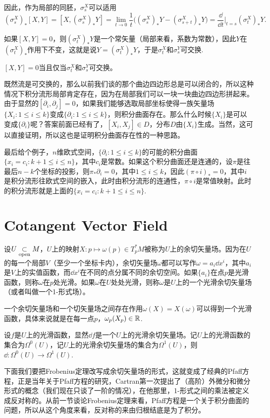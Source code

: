 因此，作为局部的同胚，$\sigma_s^X$可以适用
\[
	(\sigma_s^X)_*[X,Y]=[X,(\sigma_s^X)_*Y]=\lim_{t\to 0}\frac{1}{t}\bigl((\sigma_s^X)_*Y-(\sigma_{s+t}^X)_*Y\bigr)=\frac{\dd}{\dd t}\biggr|_{t=s}(\sigma_t^X)_*Y.
\]

如果$[X,Y]=0$，则$(\sigma_t^X)_*Y$是一个常矢量（局部来看，系数为常数），因此$Y$在$(\sigma_t^X)_*$作用下不变，这就是说$Y=(\sigma_t^X)_*Y$，于是$\sigma_t^X$和$\sigma_s^Y$可交换.

\para $[X,Y]=0$当且仅当$\sigma_t^X$和$\sigma_s^Y$可交换。

既然流是可交换的，那么以前我们谈的那个曲边四边形总是可以闭合的，所以这种情况下积分流形局部肯定存在，因为在局部我们可以一块一块曲边四边形拼起来。由于显然的$[\partial_i,\partial_j]=0$，如果我们能够选取局部坐标使得一族矢量场$\{X_i:1\leq i \leq k\}$变成$\{\partial_i:1\leq i \leq k\}$，则积分曲面存在。那么什么时候$\{X_i\}$是可以变成$\{\partial_i\}$呢？答案前面已经有了，$[X_i,X_j]\in D$，分布$D$由$\{X_i\}$生成。当然，这可以直接证明，所以这也是证明积分曲面存在性的一种思路。

最后给个例子，$n$维欧式空间，$\{\partial_i:1\leq i \leq k\}$的可能的积分曲面$\{x_i=c_i:k+1\leq i \leq n\}$，其中$c_i$是常数。如果这个积分曲面还是连通的，设$\pi$是往最后$n-k$个坐标的投影，则$\pi_*\partial_i=0$，其中$1\leq i \leq k$，因此$(\pi\circ i)_*=0$，其中$i$是积分流形往欧式空间的嵌入，此时由积分流形的连通性，$\pi\circ i$是常值映射。此时的积分流形就是上面的$\{x_i=c_i:k+1\leq i \leq n\}$.
\section{Cotangent Vector Field}

\para 设$U\underset{\mathrm{open}}{\subset} M$，$U$上的映射$X:p\mapsto \omega(p)\in T_p^*M$被称为$U$上的余切矢量场。因为在$U$的每一个局部$V$（至少一个坐标卡内），余切矢量场$\omega$都可以写作$\omega=a_i\dd x^i$，其中$a_i$是$V$上的实值函数，而$\dd x^i$在不同的点分属不同的余切空间。如果$\{a_i\}$在点$p$是光滑函数，则称$\omega$在$p$处光滑。如果$\omega$在$U$处处光滑，则称$\omega$是$U$上的一个光滑余切矢量场（或者叫做一个1-形式场）。

一个余切矢量场和一个切矢量场之间存在作用$\omega(X)=X(\omega)$可以得到一个光滑函数，具体来说就是在每一点$p$，$\omega_p(X_p)\in \mathbb{R}$.

\para 设$f$是$U$上的光滑函数，显然$\dd f$是一个$U$上的光滑余切矢量场。记$U$上的光滑函数的集合为$\Omega^0(U)$，记$U$上的光滑余切矢量场的集合为$\Omega^1(U)$，则$\dd: \Omega^0(U)\to \Omega^1(U)$.

下面我们要把Frobenius定理改写成余切矢量场的形式，这就变成了经典的Pfaff方程，正是当年关于Pfaff方程的研究，Cartran第一次提出了（高阶）外微分和微分形式的概念（我们现在只谈了一阶的情况），在他那里，1-形式之间的乘法被定义成反对称的。从前一节谈论Frobenius定理来看，Pfaff方程是一个关于积分曲面的问题，所以从这个角度来看，反对称的来由归根结底是为了积分。

